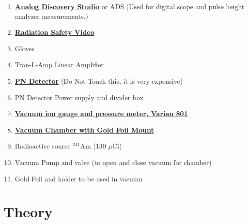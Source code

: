 \documentclass{../lab}
\begin{document}
\begin{enumerate}
    \item \href{https://digilent.com/shop/analog-discovery-studio/}{\textbf{Analog Discovery Studio}} or ADS (Used for digital scope and pulse height analyzer measurements.)

    \item \href{https://berkeley-physics111b.github.io/safety/radiation/}{\textbf{Radiation Safety Video}}

    \item Gloves


    \item Tran-L-Amp Linear Amplifier

    \item \href{https://drive.google.com/file/d/10P4Wneg-a9OkbNQRQvUf4y5rwyXPG_p0/view?usp=drive_link}{\textbf{PN Detector}} (Do Not Touch this, it is very expensive)

    \item PN Detector Power supply and divider box

    \item \href{https://drive.google.com/file/d/1X5T12iTwH8tm6YXEiFBOVgY8vileOpKm/view?usp=drive_link}{\textbf{Vacuum ion gauge and pressure meter, Varian 801}}

    \item \href{https://drive.google.com/file/d/1PBHl9fVhZDgeoZGVGwaQ1tZrCZBu5B86/view?usp=drive_link}{\textbf{Vacuum Chamber with Gold Foil Mount}}

    \item Radioactive source $^{241}$Am (130 $\mu$Ci)

    \item Vacuum Pump and valve (to open and close vacuum for chamber)

    \item Gold Foil and holder to be used in vacuum

\end{enumerate}

\newpage

\section{Theory}
\end{document}

